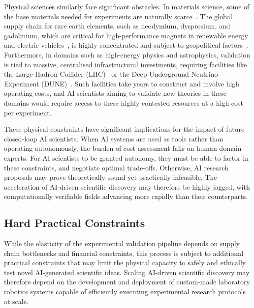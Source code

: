 \documentclass[11pt, a4paper, twocolumn, goog]{google}
\begin{document}
Physical sciences similarly face significant obstacles. In materials science, some of the base materials needed for experiments are naturally scarce~\citep{de2013scarcity, filho2023understanding}. The global supply chain for rare earth elements, such as neodymium, dysprosium, and gadolinium, which are critical for high-performance magnets in renewable energy and electric vehicles~\citep{iea2025critical}, is highly concentrated and subject to geopolitical factors~\citep{baskaran2025consequences}. Furthermore, in domains such as high-energy physics and astrophysics, validation is tied to massive, centralised infrastructural investments, requiring facilities like the Large Hadron Collider (LHC)~\citep{evans2008lhc, florio2016forecasting} or the Deep Underground Neutrino Experiment (DUNE)~\citep{abi2020deep, Murayama_2023}. Such facilities take years to construct and involve high operating costs, and AI scientists aiming to validate new theories in these domains would require access to these highly contested resources at a high cost per experiment.

These physical constraints have significant implications for the impact of future closed-loop AI scientists. When AI systems are used as tools rather than operating autonomously, the burden of cost assessment falls on human domain experts. For AI scientists to be granted autonomy, they must be able to factor in these constraints, and negotiate optimal trade-offs. Otherwise, AI research proposals may prove theoretically sound yet practically infeasible. The acceleration of AI-driven scientific discovery may therefore be highly jagged, with computationally verifiable fields advancing more rapidly than their counterparts.

\subsection{Hard Practical Constraints}

While the elasticity of the experimental validation pipeline depends on supply chain bottlenecks and financial constraints, this process is subject to additional practical constraints that may limit the physical capacity to safely and ethically test novel AI-generated scientific ideas. Scaling AI-driven scientific discovery may therefore depend on the development and deployment of custom-made laboratory robotics systems capable of efficiently executing experimental research protocols at scale.
\end{document}
